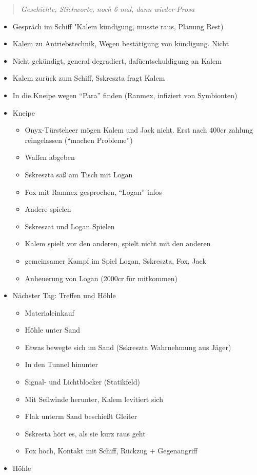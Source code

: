 \documentclass[11pt]{scrartcl}
\begin{document}
\begin{quote}
\emph{Geschichte, Stichworte, noch 6 mal, dann wieder Prosa}

\end{quote}
\begin{itemize}
\item
  Gespräch im Schiff "Kalem kündigung, musste raus, Planung Rest)
\item
  Kalem zu Antriebstechnik, Wegen bestätigung von kündigung. Nicht
\item
  Nicht gekündigt, general degradiert, dafüentschuldigung an Kalem
\item
  Kalem zurück zum Schiff, Sskreszta fragt Kalem
\item
  In die Kneipe wegen ``Para'' finden (Ranmex, infiziert von Symbionten)
\item
  Kneipe

  \begin{itemize}
  \item
    Onyx-Türsteheer mögen Kalem und Jack nicht. Erst nach 400cr zahlung
    reingelassen (``machen Probleme'')
  \item
    Waffen abgeben
  \item
    Sskreszta saß am Tisch mit Logan
  \item
    Fox mit Ranmex gesprochen, ``Logan'' infos
  \item
    Andere spielen
  \item
    Sskreszat und Logan Spielen
  \item
    Kalem spielt vor den anderen, spielt nicht mit den anderen
  \item
    gemeinsamer Kampf im Spiel Logan, Sskreszta, Fox, Jack
  \item
    Anheuerung von Logan (2000cr für mitkommen)
  \end{itemize}
\item
  Nächster Tag: Treffen und Höhle

  \begin{itemize}
  \item
    Materialeinkauf
  \item
    Höhle unter Sand
  \item
    Etwas bewegte sich im Sand (Sskreszta Wahrnehmung aus Jäger)
  \item
    In den Tunnel hinunter
  \item
    Signal- und Lichtblocker (Statikfeld)
  \item
    Mit Seilwinde herunter, Kalem levitiert sich
  \item
    Flak unterm Sand beschießt Gleiter
  \item
    Sskresta hört es, als sie kurz raus geht
  \item
    Fox hoch, Kontakt mit Schiff, Rückzug + Gegenangriff
  \end{itemize}
\item
  Höhle


\end{itemize}
\end{document}
